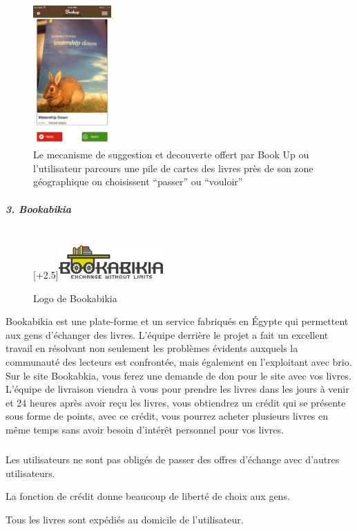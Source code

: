 \begin{figure}[h]
	\begin{center}
		\includegraphics[width=3cm]{Images/chapter1/bookUpScreenshot.jpg}
		\caption{\scriptsize {Le mecanisme de suggestion et decouverte offert par Book Up ou l'utilisateur parcours une pile de cartes des livres près de son zone géographique on choisissent “passer” ou “vouloir”}}
	\end{center}
\end{figure}
\newpage

\subparagraph{{\large 3. Bookabikia\\\\}}

\begin{figure}
	\raisebox{0pt}[\dimexpr\height+2.5\baselineskip\relax]{\includegraphics[width=4cm]{Images/chapter1/bookabikiaLogo.png}}
	\caption{Logo de Bookabikia}
\end{figure}

Bookabikia est une plate-forme et un service fabriqués en Égypte qui permettent aux gens d'échanger des livres. L'équipe derrière le projet a fait un excellent travail en résolvant non seulement les problèmes évidents auxquels la communauté des lecteurs est confrontée, mais également en l'exploitant avec brio. Sur le site Bookabkia, vous ferez une demande de don pour le site avec vos livres. L’équipe de livraison viendra à vous pour prendre les livres dans les jours à venir et 24 heures après avoir reçu les livres, vous obtiendrez un crédit qui se présente sous forme de points, avec ce crédit, vous pourrez acheter plusieurs livres en même temps sans avoir besoin d’intérêt personnel pour vos livres.\cite{noauthor_bookabikia_nodate}

\subparagraph*{}
\begin{list}{•}{\textbf{Avantages}}
	\item Les utilisateurs ne sont pas obligés de passer des offres d'échange avec d'autres utilisateurs.
	\item La fonction de crédit donne beaucoup de liberté de choix aux gens.
	\item Tous les livres sont expédiés au domicile de l'utilisateur.
\end{list}

